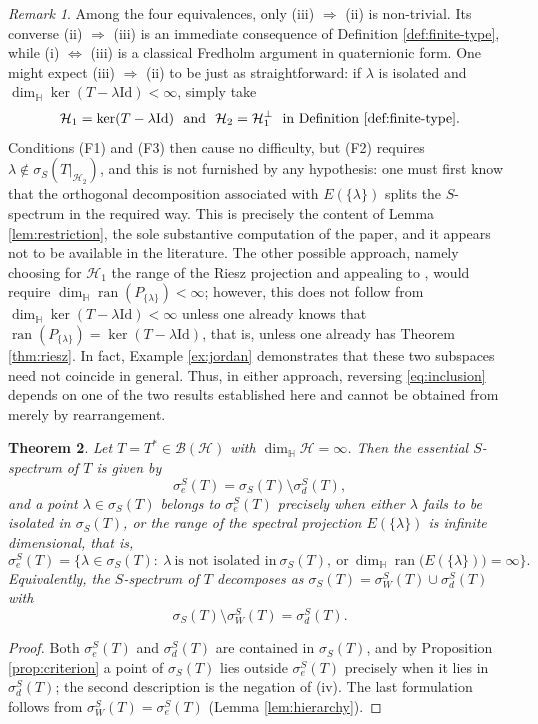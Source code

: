 \documentclass[12pt,a4paper]{article}
\theoremstyle{plain}
\newtheorem{theorem}{Theorem}[section]
\theoremstyle{definition}
\theoremstyle{remark}
\newtheorem{remark}[theorem]{Remark}
\newcommand{\HH}{\mathbb H}
\newcommand{\BB}{\mathcal B}
\newcommand{\Id}{\mathrm{Id}}
\newcommand{\HS}{\mathcal H}
\newcommand{\dimH}{\dim_{\HH}}
\newcommand{\sigS}{\sigma_S}
\newcommand{\sigeS}{\sigma_{e}^{S}}
\newcommand{\sigwS}{\sigma_{W}^{S}}
\newcommand{\sigdS}{\sigma_{d}^{S}}
\DeclareMathOperator{\ran}{ran}
\begin{document}
{\begin{remark}
\label{rem:where-the-work-is}
Among the four equivalences, only (iii) $\Rightarrow$ (ii) is
non-trivial. Its converse (ii) $\Rightarrow$ (iii) is an immediate
consequence of Definition \ref{def:finite-type}, while
(i) $\Leftrightarrow$ (iii) is a classical Fredholm argument in
quaternionic form. One might expect (iii) $\Rightarrow$ (ii) to be
just as straightforward: if $\lambda$ is isolated and
$\dimH\ker(T-\lambda\Id)<\infty$, simply take
$$\HS_1=\ker(T-\lambda\Id) ~~\hbox{and}~~\HS_2=\HS_1^\perp ~~\hbox{in Definition
\ref{def:finite-type}}.$$ Conditions (F1) and (F3) then cause no
difficulty, but (F2) requires $\lambda\notin\sigS(T|_{\HS_2})$, and
this is not furnished by any hypothesis: one must first know that the
orthogonal decomposition associated with $E(\{\lambda\})$ splits the
$S$-spectrum in the required way. This is precisely the content of
Lemma \ref{lem:restriction}, the sole substantive computation of the
paper, and it appears not to be available in the literature. The other
possible approach, namely choosing for $\HS_1$ the range of the Riesz
projection and appealing to
\cite[Theorem 3.10]{BaloudiBelgacemJeribi2022}, would require
$\dimH\ran(P_{\{\lambda\}})<\infty$; however, this does not follow
from $\dimH\ker(T-\lambda\Id)<\infty$ unless one already knows that
$\ran(P_{\{\lambda\}})=\ker(T-\lambda\Id)$, that is, unless one
already has Theorem \ref{thm:riesz}. In fact, Example \ref{ex:jordan}
demonstrates that these two subspaces need not coincide in general.
Thus, in either approach, reversing \eqref{eq:inclusion} depends on
one of the two results established here and cannot be obtained from
\cite{BaloudiBelgacemJeribi2022} merely by rearrangement.
\end{remark}

\begin{theorem}
\label{thm:main}
Let $T=T^*\in\BB(\HS)$ with $\dimH\HS=\infty$. Then the essential
$S$-spectrum of $T$ is given by
\[
 \sigeS(T)=\sigS(T)\setminus\sigdS(T),
\]
and a point $\lambda\in\sigS(T)$ belongs to $\sigeS(T)$ precisely when
either $\lambda$ fails to be isolated in $\sigS(T)$, or the range of
the spectral projection $E(\{\lambda\})$ is infinite dimensional, that
is,
\[
 \sigeS(T)
 =\Big\{\lambda\in\sigS(T):\ \lambda\ \text{is not isolated in}\
 \sigS(T),\ \text{or}\ \dimH\ran\big(E(\{\lambda\})\big)=\infty\Big\}.
\]
Equivalently, the $S$-spectrum of $T$ decomposes as
$\sigS(T)=\sigwS(T)\cup\sigdS(T)$ with
$$\sigS(T)\setminus\sigwS(T)=\sigdS(T).$$
\end{theorem}
\begin{proof}
Both $\sigeS(T)$ and $\sigdS(T)$ are contained in $\sigS(T)$, and by
Proposition \ref{prop:criterion} a point of $\sigS(T)$ lies outside
$\sigeS(T)$ precisely when it lies in $\sigdS(T)$; the second
description is the negation of (iv). The last formulation follows from
$\sigwS(T)=\sigeS(T)$ (Lemma \ref{lem:hierarchy}).
\end{proof}

}
\end{document}

